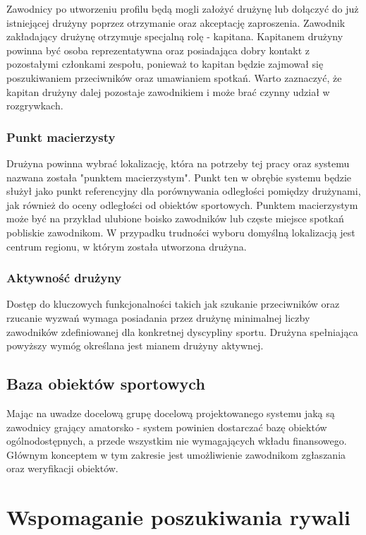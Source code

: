 Zawodnicy po utworzeniu profilu będą mogli założyć drużynę lub dołączyć do już istniejącej drużyny poprzez otrzymanie oraz akceptację zaproszenia. Zawodnik zakładający drużynę otrzymuje specjalną rolę - kapitana. Kapitanem drużyny powinna być osoba reprezentatywna oraz posiadająca dobry kontakt z pozostałymi członkami zespołu, ponieważ to kapitan będzie zajmował się poszukiwaniem przeciwników oraz umawianiem spotkań. Warto zaznaczyć, że kapitan drużyny dalej pozostaje zawodnikiem i może brać czynny udział w rozgrywkach. 

\subsubsection{Punkt macierzysty}

Drużyna powinna wybrać lokalizację, która na potrzeby tej pracy oraz systemu nazwana została "punktem macierzystym". Punkt ten w obrębie systemu będzie służył jako punkt referencyjny dla porównywania odległości pomiędzy drużynami, jak również do oceny odległości od obiektów sportowych. Punktem macierzystym może być na przykład ulubione boisko zawodników lub częste miejsce spotkań pobliskie zawodnikom. W przypadku trudności wyboru domyślną lokalizacją jest centrum regionu, w którym została utworzona drużyna.

\subsubsection{Aktywność drużyny}

Dostęp do kluczowych funkcjonalności takich jak szukanie przeciwników oraz rzucanie wyzwań wymaga posiadania przez drużynę minimalnej liczby zawodników zdefiniowanej dla konkretnej dyscypliny sportu. Drużyna spełniająca powyższy wymóg określana jest mianem drużyny aktywnej.

\subsection{Baza obiektów sportowych}

Mając na uwadze docelową grupę docelową projektowanego systemu jaką są zawodnicy grający amatorsko - system powinien dostarczać bazę obiektów ogólnodostępnych, a przede wszystkim nie wymagających wkładu finansowego. Głównym konceptem w tym zakresie jest umożliwienie zawodnikom zgłaszania oraz weryfikacji obiektów. 

\section{Wspomaganie poszukiwania rywali}

